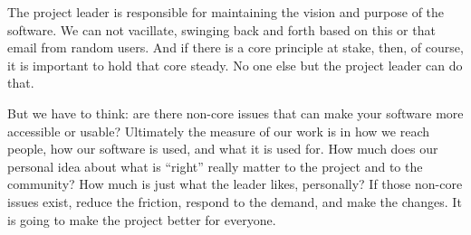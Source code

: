 The project leader is responsible for maintaining the vision and purpose of the
software. We can not vacillate, swinging back and forth based on this or that
email from random users. And if there is a core principle at stake, then, of
course, it is important to hold that core steady. No one else but the project
leader can do that.

But we have to think: are there non-core issues that can make your software more
accessible or usable? Ultimately the measure of our work is in how we reach people, how our software is used, and what it is used for. How much does our personal idea about what is ``right'' really matter to the project and to the community? How much is just what the leader likes, personally? If those non-core issues exist, reduce the friction, respond to the demand, and make the changes. It is going to make the project better for everyone.
